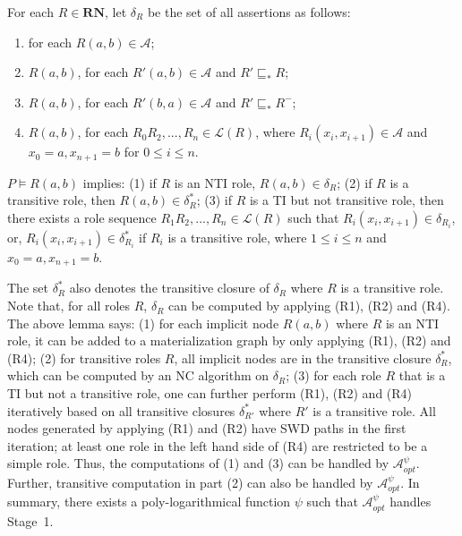 \begin{definition}\label{def:deltaRdhlplus}
For each $R\in\textbf{RN}$, let $\delta_R$ be the set of all assertions as follows:
\begin{enumerate}[leftmargin=4ex,label=\arabic*.]
\item for each $R(a,b)\in\mathcal{A}$;
\item $R(a,b)$, for each $R'(a,b)\in\mathcal{A}$ and $R'\sqsubseteq_{*}R$;
\item $R(a,b)$, for each $R'(b,a)\in\mathcal{A}$ and $R'\sqsubseteq_{*}R^-$;
\item $R(a,b)$, for each $R_0R_2,...,R_n\in\mathcal{L}(R)$, where $R_i(x_i,x_{i+1})\in\mathcal{A}$ and $x_0=a, x_{n+1}=b$ for $0\leq i\leq n$.
\end{enumerate}
\end{definition}

\begin{lemma}\label{lemma:tiplus}
$P\models R(a,b)$ implies: (1) if $R$ is an NTI role, $R(a,b)\in\delta_R$;
(2) if $R$ is a transitive role, then $R(a,b)\in\delta^*_R$;
(3) if $R$ is a TI but not transitive role, then there exists a role sequence $R_1R_2,...,R_n\in\mathcal{L}(R)$ such that
$R_i(x_i,x_{i+1})\in\delta_{R_i}$, or, $R_i(x_i,x_{i+1})\in\delta^*_{R_i}$ if $R_i$ is a transitive role,
where $1\leq i\leq n$ and $x_0=a, x_{n+1}=b$.
\end{lemma}

The set $\delta^*_R$ also denotes the transitive closure of $\delta_R$ where $R$ is a transitive role.
Note that, for all roles $R$, $\delta_R$ can be computed by applying (R1), (R2) and (R4).
The above lemma says:
(1) for each implicit node $R(a,b)$ where $R$ is an NTI role,
it can be added to a materialization graph by only applying (R1), (R2) and (R4);
(2) for transitive roles $R$, all implicit nodes are in the transitive closure $\delta^*_{R}$,
which can be computed by an NC algorithm on $\delta_{R}$;
(3) for each role $R$ that is a TI but not a transitive role,
one can further perform (R1), (R2) and (R4) iteratively based on all
transitive closures $\delta^*_{R'}$ where $R'$ is a transitive role.
All nodes generated by applying (R1) and (R2) have SWD paths in the first iteration; at
least one role in the left hand side of (R4) are restricted to be a simple role.
Thus, the computations of (1) and (3) can be handled by $\mathcal{A}_{opt}^\psi$.
Further, transitive computation in part (2) can also be handled by $\mathcal{A}_{opt}^\psi$.
In summary, there exists a poly-logarithmical function $\psi$
such that $\mathcal{A}_{opt}^\psi$ handles Stage~1.

